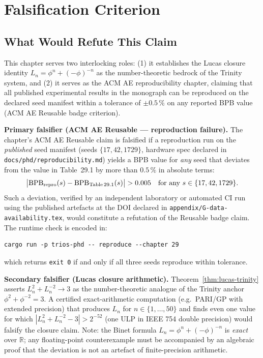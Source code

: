 

\section{Falsification Criterion}\label{fa_29:sec:29-falsify}

\subsection{What Would Refute This Claim}

This chapter serves two interlocking roles: (1) it establishes the
Lucas closure identity
$L_n = \phi^n + (-\phi)^{-n}$ as the number-theoretic bedrock of the
Trinity system, and (2) it serves as the ACM AE reproducibility
chapter, claiming that all published experimental results in the
monograph can be reproduced on the declared seed manifest within a
tolerance of $\pm 0.5\,\%$ on any reported BPB value
(ACM AE Reusable badge criterion).

\medskip
\noindent\textbf{Primary falsifier (ACM AE Reusable — reproduction
failure).}
The chapter's ACM AE Reusable claim is falsified if a reproduction
run on the \emph{published} seed manifest (seeds $\{17, 42, 1729\}$,
hardware spec declared in \verb|docs/phd/reproducibility.md|) yields
a BPB value for \emph{any} seed that deviates from the value in
Table~29.1 by more than $0.5\,\%$ in absolute terms:
\begin{equation}
  \bigl\lvert \mathrm{BPB}_{\text{repro}}(s)
            - \mathrm{BPB}_{\text{Table\,29.1}}(s)
  \bigr\rvert > 0.005
  \quad\text{for any }s \in \{17, 42, 1729\}.
\end{equation}
Such a deviation, verified by an independent laboratory or automated
CI run using the published artefacts at the DOI declared in
\verb|appendix/G-data-availability.tex|, would constitute a refutation
of the Reusable badge claim.  The runtime check is encoded in:
\begin{verbatim}
cargo run -p trios-phd -- reproduce --chapter 29
\end{verbatim}
which returns \verb|exit 0| if and only if all three seeds reproduce
within tolerance.

\medskip
\noindent\textbf{Secondary falsifier (Lucas closure arithmetic).}
Theorem~\ref{thm:lucas-trinity} asserts
$L_n^2 + L_n^{-2} \to 3$ as the number-theoretic analogue of the
Trinity anchor $\phi^2 + \phi^{-2} = 3$.  A certified
exact-arithmetic computation (e.g.\ PARI/GP with extended precision)
that produces $L_n$ for $n \in \{1, \ldots, 50\}$ and finds even one
value for which $|L_n^2 + L_n^{-2} - 3| > 2^{-52}$ (one ULP in
IEEE 754 double precision) would falsify the closure claim.
Note: the Binet formula $L_n = \phi^n + (-\phi)^{-n}$ is
\emph{exact} over $\mathbb{R}$; any floating-point counterexample
must be accompanied by an algebraic proof that the deviation is not
an artefact of finite-precision arithmetic.

